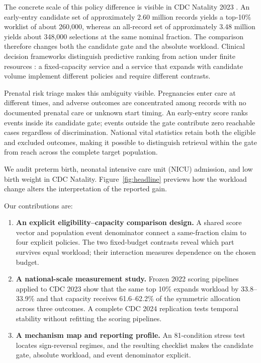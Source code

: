 \documentclass{article}
\begin{document}
The concrete scale of this policy difference is visible in CDC Natality 2023
\citep{cdcNatality}. An early-entry candidate set of approximately 2.60 million
records yields a top-10\% worklist of about 260,000, whereas an all-record set
of approximately 3.48 million yields about 348,000 selections at the same
nominal fraction. The comparison therefore changes both the candidate gate and
the absolute workload. Clinical decision frameworks distinguish predictive
ranking from action under finite resources
\citep{jung2021framework,singh2023resource}: a fixed-capacity service and a
service that expands with candidate volume implement different policies and
require different contrasts.

Prenatal risk triage makes this ambiguity visible. Pregnancies enter care at
different times, and adverse outcomes are concentrated among records with no
documented prenatal care or unknown start timing. An early-entry score ranks
events inside its candidate gate; events outside the gate contribute zero
reachable cases regardless of discrimination. National vital statistics retain both the eligible and
excluded outcomes, making it possible to distinguish retrieval within the gate
from reach across the complete target population.

We audit preterm birth, neonatal intensive care unit (NICU) admission, and low
birth weight in CDC Natality. Figure~\ref{fig:headline} previews how the
workload change alters the interpretation of the reported gain.

Our contributions are:
\begin{enumerate}
  \item \textbf{An explicit eligibility--capacity comparison design.} A shared score vector and
  population event denominator connect a same-fraction claim to four explicit
  policies. The two fixed-budget contrasts reveal which part survives equal
  workload; their interaction measures dependence on the chosen budget.
  \item \textbf{A national-scale measurement study.} Frozen 2022 scoring
  pipelines applied to CDC 2023 show that the same top 10\% expands workload by
  33.8--33.9\% and that capacity receives 61.6--62.2\% of the symmetric allocation
  across three outcomes. A complete CDC 2024 replication tests temporal stability
  without refitting the scoring pipelines.
  \item \textbf{A mechanism map and reporting profile.} An 81-condition stress
  test locates sign-reversal regimes, and the resulting checklist makes the
  candidate gate, absolute workload, and event denominator explicit.
\end{enumerate}
\end{document}
